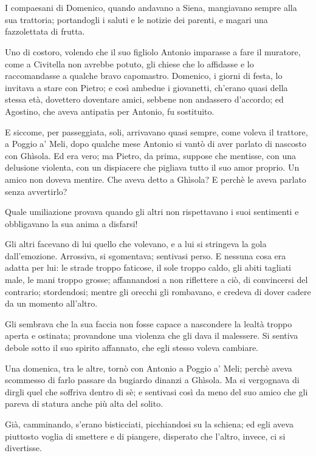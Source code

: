 \chapter{}

I compaesani di Domenico, quando andavano a Siena, mangiavano sempre alla sua trattoria; portandogli i saluti e le notizie dei parenti, e magari una fazzolettata di frutta.

Uno di costoro, volendo che il suo figliolo Antonio imparasse a fare il muratore, come a Civitella non avrebbe potuto, gli chiese che lo affidasse e lo raccomandasse a qualche bravo capomastro. Domenico, i giorni di festa, lo invitava a stare con Pietro; e così ambedue i giovanetti, ch’erano quasi della stessa età, dovettero doventare amici, sebbene non andassero d’accordo; ed Agostino, che aveva antipatia per Antonio, fu sostituito.

E siccome, per passeggiata, soli, arrivavano quasi sempre, come voleva il trattore, a Poggio a’ Meli, dopo qualche mese Antonio si vantò di aver parlato di nascosto con Ghìsola. Ed era vero; ma Pietro, da prima, suppose che mentisse, con una delusione violenta, con un dispiacere che pigliava tutto il suo amor proprio. Un amico non doveva mentire. Che aveva detto a Ghìsola? E perchè le aveva parlato senza avvertirlo?

Quale umiliazione provava quando gli altri non rispettavano i suoi sentimenti e obbligavano la sua anima a disfarsi!

Gli altri facevano di lui quello che volevano, e a lui si stringeva la gola dall’emozione. Arrossiva, si sgomentava; sentivasi perso. E nessuna cosa era adatta per lui: le strade troppo faticose, il sole troppo caldo, gli abiti tagliati male, le mani troppo grosse; affannandosi a non riflettere a ciò, di convincersi del contrario; stordendosi; mentre gli orecchi gli rombavano, e credeva di dover cadere da un momento all’altro.

Gli sembrava che la sua faccia non fosse capace a nascondere la lealtà troppo aperta e ostinata; provandone una violenza che gli dava il malessere. Si sentiva debole sotto il suo spirito affannato, che egli stesso voleva cambiare.

Una domenica, tra le altre, tornò con Antonio a Poggio a’ Meli; perchè aveva scommesso di farlo passare da bugiardo dinanzi a Ghìsola. Ma si vergognava di dirgli quel che soffriva dentro di sè; e sentivasi così da meno del suo amico che gli pareva di statura anche più alta del solito.

Già, camminando, s’erano bisticciati, picchiandosi su la schiena; ed egli aveva piuttosto voglia di smettere e di piangere, disperato che l’altro, invece, ci si divertisse.

